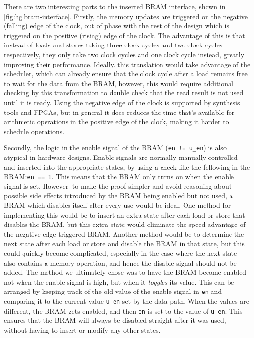 There are two interesting parts to the inserted \gls{BRAM} interface, shown in
\cref{fig:hg:bram-interface}.  Firstly, the memory updates are triggered on the
negative (falling) edge of the clock, out of phase with the rest of the design
which is triggered on the positive (rising) edge of the clock.  The advantage of
this is that instead of loads and stores taking three clock cycles and two clock
cycles respectively, they only take two clock cycles and one clock cycle
instead, greatly improving their performance.  Ideally, this translation would
take advantage of the scheduler, which can already ensure that the clock cycle
after a load remains free to wait for the data from the \gls{BRAM}, however,
this would require additional checking by this transformation to double check
that the read result is not used until it is ready.  Using the negative edge of
the clock is supported by synthesis tools and FPGAs, but in general it does
reduces the time that's available for arithmetic operations in the positive edge
of the clock, making it harder to schedule operations.

Secondly, the logic in the enable signal of the \gls{BRAM} (\texttt{en !=
  u\_en}) is also atypical in hardware designs.  Enable signals are normally
manually controlled and inserted into the appropriate states, by using a check
like the following in the \gls{BRAM}:\@ \texttt{en == 1}.  This means that the
\gls{BRAM} only turns on when the enable signal is set.  However, to make the
proof simpler and avoid reasoning about possible side effects introduced by the
\gls{BRAM} being enabled but not used, a \gls{BRAM} which disables itself after
every use would be ideal.  One method for implementing this would be to insert
an extra state after each load or store that disables the \gls{BRAM}, but this
extra state would eliminate the speed advantage of the negative-edge-triggered
\gls{BRAM}. Another method would be to determine the next state after each load
or store and disable the \gls{BRAM} in that state, but this could quickly become
complicated, especially in the case where the next state also contains a memory
operation, and hence the disable signal should not be added. The method we
ultimately chose was to have the \gls{BRAM} become enabled not when the enable
signal is high, but when it \emph{toggles} its value.  This can be arranged by
keeping track of the old value of the enable signal in \texttt{en} and comparing
it to the current value \texttt{u\_en} set by the data path.  When the values
are different, the \gls{BRAM} gets enabled, and then \texttt{en} is set to the
value of \texttt{u\_en}. This ensures that the \gls{BRAM} will always be
disabled straight after it was used, without having to insert or modify any
other states.

